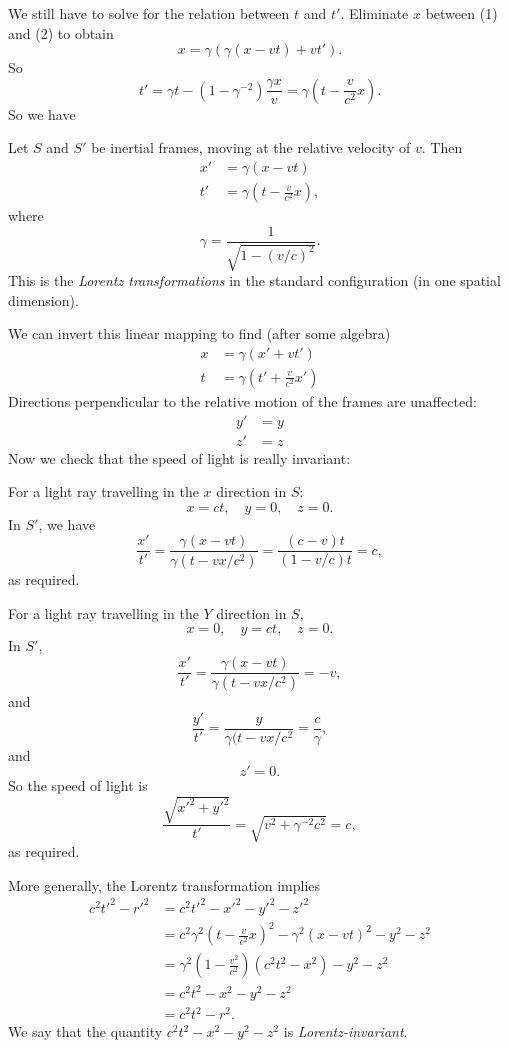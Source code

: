 \documentclass[a4paper]{article}
\begin{document}
We still have to solve for the relation between $t$ and $t'$. Eliminate $x$ between (1) and (2) to obtain
\[
  x = \gamma(\gamma(x - vt) + vt').
\]
So
\[
  t' = \gamma t - (1 - \gamma^{-2})\frac{\gamma x}{v} = \gamma\left(t - \frac{v}{c^2}x\right).
\]
So we have
\begin{law}
  Let $S$ and $S'$ be inertial frames, moving at the relative velocity of $v$. Then
  \begin{align*}
    x' &= \gamma(x - vt)\\
    t' &= \gamma\left(t - \frac{v}{c^2}x\right),
  \end{align*}
  where
  \[
    \gamma = \frac{1}{\sqrt{1 - (v/c)^2}}.
  \]
  This is the \emph{Lorentz transformations} in the standard configuration (in one spatial dimension).
\end{law}
We can invert this linear mapping to find (after some algebra)
\begin{align*}
  x &= \gamma(x' + vt')\\
  t &= \gamma\left(t' + \frac{v}{c^2}x'\right)
\end{align*}
Directions perpendicular to the relative motion of the frames are unaffected:
\begin{align*}
  y' &= y\\
  z' &= z
\end{align*}
Now we check that the speed of light is really invariant:

For a light ray travelling in the $x$ direction in $S$:
\[
  x = ct,\quad y = 0,\quad z = 0.
\]
In $S'$, we have
\[
  \frac{x'}{t'} = \frac{\gamma(x - vt)}{\gamma(t - vx/c^2)} = \frac{(c - v)t}{(1 - v/c)t} = c,
\]
as required.

For a light ray travelling in the $Y$ direction in $S$,
\[
  x = 0,\quad y = ct,\quad z = 0.
\]
In $S'$,
\[
  \frac{x'}{t'} = \frac{\gamma(x - vt)}{\gamma(t - vx/c^2)} = -v,
\]
and
\[
  \frac{y'}{t'} = \frac{y}{\gamma(t - vx/c^2} = \frac{c}{\gamma},
\]
and
\[
  z' = 0.
\]
So the speed of light is
\[
  \frac{\sqrt{x'^2 + y'^2}}{t'} = \sqrt{v^2 + \gamma^{-2}c^2} = c,
\]
as required.

More generally, the Lorentz transformation implies
\begin{align*}
  c^2t'^2 - r'^2 &= c^2t'^2 - x'^2 - y'^2 - z'^2\\
  &= c^2 \gamma^2\left(t - \frac{v}{c^2}x\right)^2 - \gamma^2(x - vt)^2 - y^2 - z^2\\
  &= \gamma^2\left(1 - \frac{v^2}{c^2}\right)(c^2t^2 - x^2) - y^2 - z^2\\
  &= c^2t^2 - x^2 - y^2 - z^2\\
  &= c^2t^2 - r^2.
\end{align*}
We say that the quantity $c^2t^2 - x^2 - y^2 - z^2$ is \emph{Lorentz-invariant}.
\end{document}
